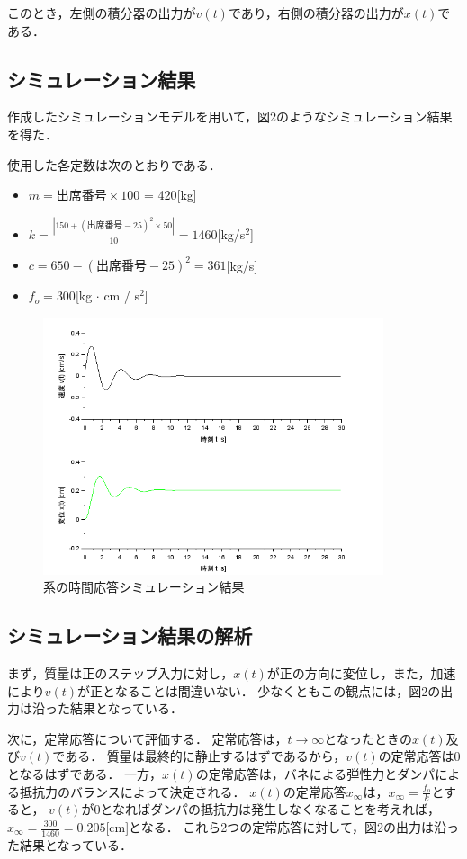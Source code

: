 \documentclass[dvipdfmx,titlepage,a4j]{jsarticle}  %
\begin{document}
このとき，左側の積分器の出力が$v(t)$であり，右側の積分器の出力が$x(t)$である．

\subsection{シミュレーション結果}
作成したシミュレーションモデルを用いて，図2のようなシミュレーション結果を得た．

使用した各定数は次のとおりである．
\begin{itemize}
  \item $m = 出席番号 \times 100$ = 420[kg]
  \item $k = \frac{|150 + (出席番号 - 25)^2 \times 50|}{10} = 1460$[kg/s$^2$]
  \item $c = 650 - (出席番号 - 25)^2 = 361$[kg/s]
  \item $f_o = 300$[kg $\cdot$ cm / s$^2$]
\end{itemize}

\begin{figure}[H]
  \centering
  \includegraphics[width=10cm]{../graph/bane-graph.png}
  \caption{系の時間応答シミュレーション結果}
  \label{fig:bane-graph.png}
\end{figure}

\subsection{シミュレーション結果の解析}
まず，質量は正のステップ入力に対し，$x(t)$が正の方向に変位し，また，加速により$v(t)$が正となることは間違いない．
少なくともこの観点には，図2の出力は沿った結果となっている．

次に，定常応答について評価する．
定常応答は，$t \rightarrow \infty$となったときの$x(t)$及び$v(t)$である．
質量は最終的に静止するはずであるから，$v(t)$の定常応答は0となるはずである．
一方，$x(t)$の定常応答は，バネによる弾性力とダンパによる抵抗力のバランスによって決定される．
$x(t)$の定常応答$x_\infty$は，$x_\infty = \frac{f_o}{k}$とすると，
$v(t)$が0となればダンパの抵抗力は発生しなくなることを考えれば，$x_\infty = \frac{300}{1460} = 0.205$[cm]となる．
これら2つの定常応答に対して，図2の出力は沿った結果となっている．
\end{document}
